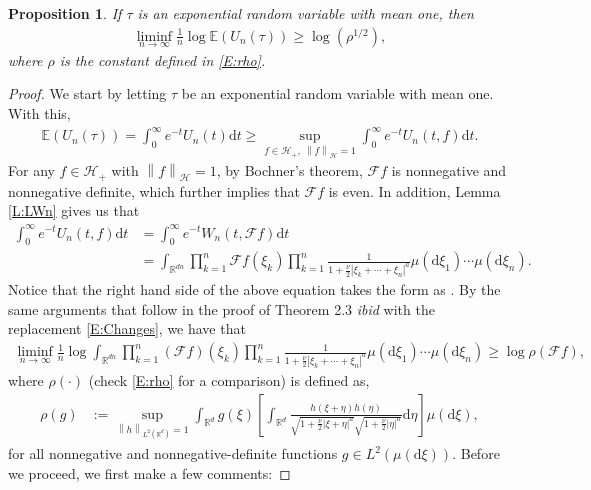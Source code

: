 \documentclass[a4paper,11pt]{article}
\numberwithin{equation}{section}
\numberwithin{equation}{section}
\theoremstyle{plain}
\newtheorem{proposition}[theorem]{Proposition}
\theoremstyle{definition}
\newcommand{\ud}{\ensuremath{\mathrm{d} }}
\newcommand{\Norm}[1]{\left\|  #1   \right\|}
\newcommand{\R}{\mathbb{R}}
\begin{document}
\begin{proposition} \label{P:LogU}
  If $\tau$ is an exponential random variable with mean one, then
  \begin{align*}
    \liminf_{n\to \infty} \frac{1}{n} \log \mathbb{E} (U_n(\tau) ) \ge \log(\rho^{1/2}),
  \end{align*}
  where $\rho$ is the constant defined in \eqref{E:rho}.
\end{proposition}
\begin{proof}
  We start by letting $\tau$ be an exponential random variable with mean one. With this,
  \begin{align*}
        \mathbb{E}\left(U_n(\tau)\right)
    =   \int_0^\infty e^{-t} U_n(t) \ud t
    \ge \sup_{f\in \mathcal{H}_+,\: \Norm{f}_\mathcal{H} =1} \int_0^\infty e^{-t} U_n(t,f) \ud t.
  \end{align*}
  For any $f \in \mathcal{H}_+$ with $\Norm{f}_{\mathcal{H}}= 1$, by Bochner's theorem,
  $\mathcal{F}f$ is nonnegative and nonnegative definite, which further implies that $\mathcal{F}f$
  is even. In addition, Lemma \ref{L:LWn} gives us that
  \begin{align*}
    \int_0^{\infty} e^{-t} U_n(t,f) \ud t
    & = \int_0^\infty e^{-t} W_n(t,\mathcal{F}f) \ud t \\
    & = \int_{\R^{dn}} \prod_{k=1}^n \mathcal{F}f(\xi_k) \prod_{k=1}^n \frac{1}{1+ \frac{\nu}{2}|\xi_k+\cdots + \xi_n|^a} \mu(\ud \xi_1) \cdots \mu(\ud \xi_n).
  \end{align*}
  Notice that the right hand side of the above equation takes the form as \cite[Equation
  (3.3)]{BCR09}. By the same arguments that follow in the proof of Theorem 2.3 {\it ibid} with the
  replacement \eqref{E:Changes}, we have that
  \begin{align*}
    \liminf_{n\to \infty}\frac{1}{n} \log \int_{\R^{dn}} \prod_{k=1}^n(\mathcal{F}f)(\xi_k) \prod_{k=1}^n\frac{1}{1+\frac{\nu}{2}|\xi_k+\cdots+\xi_n|^a} \mu(\ud \xi_1) \cdots \mu(\ud \xi_n) \ge  \log\rho(\mathcal{F}f),
  \end{align*}
  where $\rho(\cdot)$ (check \eqref{E:rho} for a comparison) is defined as,
  \begin{align} \label{E:rho'g}
    \rho(g) &:= \sup_{\Norm{h}_{L^2(\R^d)}=1} \int_{\R^d}g(\xi)
    \left[
      \int_{\R^d} \frac{h(\xi + \eta)h(\eta)}{\sqrt{1+\frac{\nu}{2}|\xi+\eta|^a}\sqrt{1+\frac{\nu}{2}|\eta|^a}} \ud \eta
    \right]
    \mu(\ud \xi),
  \end{align}
  for all nonnegative and nonnegative-definite functions $g\in L^2\left(\mu(\ud\xi)\right)$. Before
  we proceed, we first make a few comments: \medskip


\end{proof}
\end{document}
